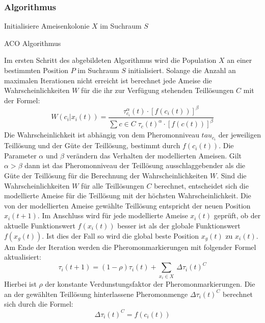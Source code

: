 \documentclass[a4paper, 11pt]{article}
\begin{document}
\subsubsection{Algorithmus}
\begin{framed}
	\begin{algorithm}[H]
		Initialisiere Ameisenkolonie $X$ im Suchraum $S$\;
		\caption{\acs{ACO} Algorithmus}
		\label{acoalgo}
	\end{algorithm}
\end{framed}
Im ersten Schritt des abgebildeten Algorithmus wird die Population $X$ an einer bestimmten Position $P$ im Suchraum $S$ initialisiert. Solange die Anzahl an maximalen Iterationen nicht erreicht ist berechnet jede Ameise die Wahrscheinlichkeiten $W$ für die ihr zur Verfügung stehenden Teillösungen $C$ mit der Formel:
\begin{equation}
W(c_{i}|x_{i}(t)) = \frac{\tau_{c_{i}}^\alpha(t) \cdot [f(c_{i}(t))]^\beta}{\sum_{} c \in C\; \tau_{c}(t)^\alpha \cdot [f(c(t))]^\beta}
\end{equation}
Die Wahrscheinlichkeit ist abhängig von dem Pheromonniveau $tau_{c_{i}}$ der jeweiligen Teillösung und der Güte der Teillösung, bestimmt durch $f(c_{i}(t))$. Die Parameter $\alpha$ und $\beta$ verändern das Verhalten der modellierten Ameisen. Gilt $\alpha > \beta$ dann ist das Pheromonniveau der Teillösung ausschlaggebender als die Güte der Teillösung für die Berechnung der Wahrscheinlichkeiten $W$. Sind die Wahrscheinlichkeiten $W$ für alle Teillösungen $C$ berechnet, entscheidet sich die modellierte Ameise für die Teillösung mit der höchsten Wahrscheinlichkeit. Die von der modellierten Ameise gewählte Teillösung entspricht der neuen Position $x_{i}(t+1)$. Im Anschluss wird für jede modellierte Ameise $x_{i}(t)$ geprüft, ob der aktuelle Funktionswert $f(x_{i}(t))$  besser ist als der globale Funktionswert $f(x_{g}(t))$. Ist dies der Fall so wird die global beste Position $x_{g}(t)$ zu $x_{i}(t)$. Am Ende der Iteration werden die Pheromonmarkierungen mit folgender Formel aktualisiert:
\begin{equation}
\tau_{i}(t+1) = (1 - \rho) \tau_{i}(t) + \sum_{x_{i} \in X}\ \Delta \tau_{i}(t)^C
\end{equation}
Hierbei ist $\rho$ der konstante Verdunstungsfaktor der Pheromonmarkierungen. Die an der gewählten Teillösung hinterlassene Pheromonmenge $\Delta \tau_{i}(t)^C$ berechnet sich durch die Formel:
\begin{equation}
\Delta \tau_{i}(t)^C = f(c_{i}(t))
\end{equation}
\newpage
\end{document}

